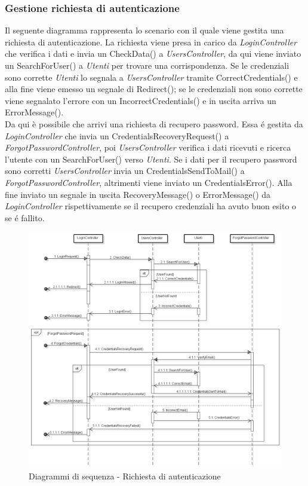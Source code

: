 \subsubsection{Gestione richiesta di autenticazione}
Il seguente diagramma rappresenta lo scenario con il quale viene gestita una richiesta di autenticazione. La richiesta viene presa in carico da \textit{LoginController} che verifica i dati e invia un CheckData() a \textit{UsersController}, da qui viene inviato un SearchForUser() a \textit{Utenti} per trovare una corrispondenza. Se le credenziali sono corrette \textit{Utenti} lo segnala a \textit{UsersController} tramite CorrectCredentials() e alla fine viene emesso un segnale di Redirect(); se le credenziali non sono corrette viene segnalato l'errore con un IncorrectCredentials() e in uscita arriva un ErrorMessage().\\
Da qui è possibile che arrivi una richiesta di recupero password. Essa é gestita da \textit{LoginController} che invia un CredentialsRecoveryRequest() a \textit{ForgotPasswordController}, poi \textit{UsersController} verifica i dati ricevuti e ricerca l'utente con un SearchForUser() verso \textit{Utenti}. Se i dati per il recupero password sono corretti \textit{UsersController} invia un CredentialsSendToMail() a \textit{ForgotPasswordController}, altrimenti viene inviato un CredentialsError(). Alla fine inviato un segnale in uscita RecoveryMessage() o ErrorMessage() da \textit{LoginController} rispettivamente se il recupero credenziali ha avuto buon esito o se é fallito.

\begin{figure}[H]
	\centering
	\includegraphics[scale=0.5]{img/login.png}
	\caption{Diagrammi di sequenza - Richiesta di autenticazione}
\end{figure}

